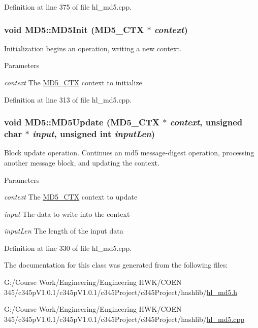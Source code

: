 Definition at line 375 of file hl\_\-md5.cpp.\hypertarget{class_m_d5_ad7a5fd3b9b97865ded5ac8ecd24905fc}{
\subsubsection[{MD5Init}]{\setlength{\rightskip}{0pt plus 5cm}void MD5::MD5Init ({\bf MD5\_\-CTX} $\ast$ {\em context})}}
\label{class_m_d5_ad7a5fd3b9b97865ded5ac8ecd24905fc}


Initialization begins an operation, writing a new context. 
\begin{DoxyParams}{Parameters}
\item[{\em context}]The \hyperlink{struct_m_d5___c_t_x}{MD5\_\-CTX} context to initialize \end{DoxyParams}


Definition at line 313 of file hl\_\-md5.cpp.\hypertarget{class_m_d5_afdab8c1ad9a976589f78a64c534d2c54}{
\subsubsection[{MD5Update}]{\setlength{\rightskip}{0pt plus 5cm}void MD5::MD5Update ({\bf MD5\_\-CTX} $\ast$ {\em context}, \/  unsigned char $\ast$ {\em input}, \/  unsigned int {\em inputLen})}}
\label{class_m_d5_afdab8c1ad9a976589f78a64c534d2c54}


Block update operation. Continues an md5 message-\/digest operation, processing another message block, and updating the context. 
\begin{DoxyParams}{Parameters}
\item[{\em context}]The \hyperlink{struct_m_d5___c_t_x}{MD5\_\-CTX} context to update \item[{\em input}]The data to write into the context \item[{\em inputLen}]The length of the input data \end{DoxyParams}


Definition at line 330 of file hl\_\-md5.cpp.

The documentation for this class was generated from the following files:\begin{DoxyCompactItemize}
\item 
G:/Course Work/Engineering/Engineering HWK/COEN 345/c345pV1.0.1/c345pV1.0.1/c345Project/c345Project/hashlib/\hyperlink{hl__md5_8h}{hl\_\-md5.h}\item 
G:/Course Work/Engineering/Engineering HWK/COEN 345/c345pV1.0.1/c345pV1.0.1/c345Project/c345Project/hashlib/\hyperlink{hl__md5_8cpp}{hl\_\-md5.cpp}\end{DoxyCompactItemize}
